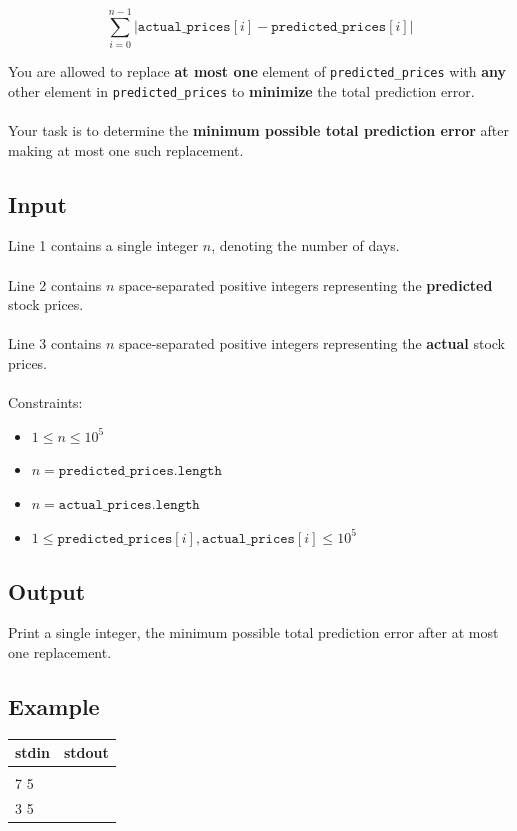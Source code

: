 \documentclass[12pt,a4paper]{article}
\begin{document}
\[
\sum_{i=0}^{n-1} \left| \texttt{actual\_prices}[i] - \texttt{predicted\_prices}[i] \right|
\]

\noindent You are allowed to replace \textbf{at most one} element of \texttt{predicted\_prices} with \textbf{any} other element in \texttt{predicted\_prices} to \textbf{minimize} the total prediction error. 
\\\\
\noindent
Your task is to determine the \textbf{minimum possible total prediction error} after making at most one such replacement.

\subsection*{\fontsize{16}{12}Input}
Line 1 contains a single integer $n$, denoting the number of days. \\\\
Line 2 contains $n$ space-separated positive integers representing the \textbf{predicted} stock prices. \\\\
Line 3 contains $n$ space-separated positive integers representing the \textbf{actual} stock prices.
\\\\
\noindent Constraints:
\begin{itemize}
    \item \( 1 \leq n \leq 10^5 \)
    \item \( n = \texttt{predicted\_prices.length} \)
    \item \( n = \texttt{actual\_prices.length} \)
    \item \( 1 \leq \texttt{predicted\_prices}[i], \texttt{actual\_prices}[i] \leq 10^5 \)
\end{itemize}

\subsection*{\fontsize{16}{12}Output}
Print a single integer, the minimum possible total prediction error after at most one replacement.

\subsection*{\fontsize{16}{12}Example}
\begin{table}[h]
  \centering
  \begin{tabularx}{\textwidth}{|>{\ttfamily}X|>{\ttfamily}X|}
  \hline
  stdin & stdout \\
  \hline
    3 & 3 \\
    1 7 5 & \\
    2 3 5 & \\  
  \hline
  \end{tabularx}
\end{table}
\end{document}
